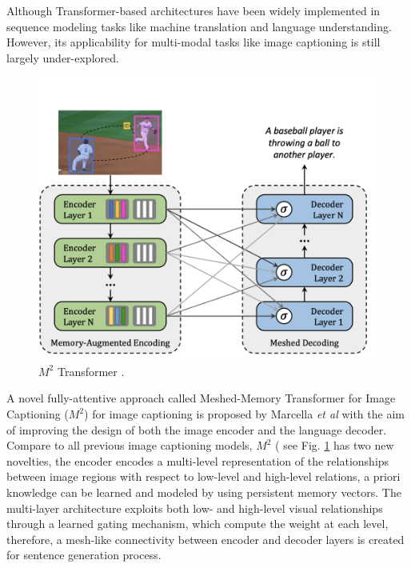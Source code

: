 \documentclass[
]{krantz}
\begin{document}
Although Transformer-based architectures have been widely implemented in sequence modeling tasks like machine translation and language understanding. However, its applicability for multi-modal tasks like image captioning is still largely under-explored. \citep{cornia2020m2}

\begin{figure}

{\centering \includegraphics[width=1\linewidth]{figures/02-01/2.2 m2arc1} 

}

\caption{\(M^2\) Transformer \citep{cornia2020m2}.}\label{fig:m2arc1}
\end{figure}



A novel fully-attentive approach called Meshed-Memory Transformer for Image Captioning (\(M^2\)) for image captioning is proposed by Marcella \emph{et al}\citep{cornia2020m2} with the aim of improving the design of both the image encoder and the language decoder. Compare to all previous image captioning models, \(M^2\) ( see Fig. \ref{fig:m2arc1} has two new novelties, the encoder encodes a multi-level representation of the relationships between image regions with respect to low-level and high-level relations, a priori knowledge can be learned and modeled by using persistent memory vectors. The multi-layer architecture exploits both low- and high-level visual relationships through a learned gating mechanism, which compute the weight at each level, therefore, a mesh-like connectivity between encoder and decoder layers is created for sentence generation process.\citep{cornia2020m2}
\end{document}
